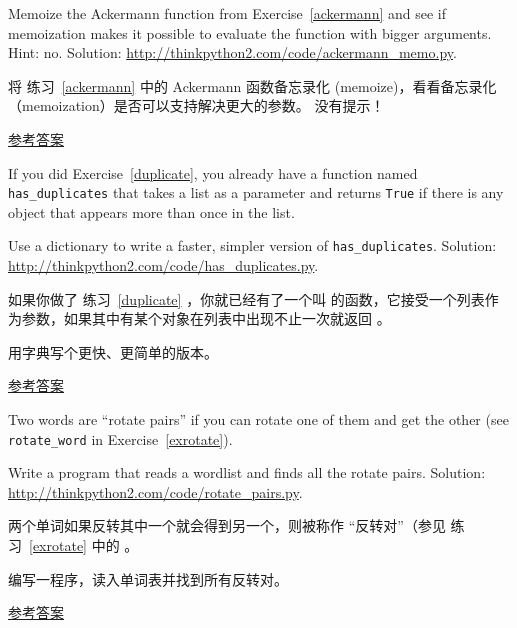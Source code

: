 \begin{exercise}
Memoize the Ackermann function from Exercise~\ref{ackermann} and see if
memoization makes it possible to evaluate the function with bigger
arguments.  Hint: no.
Solution: \url{http://thinkpython2.com/code/ackermann_memo.py}.

将 练习~\ref{ackermann} 中的 Ackermann 函数备忘录化 (memoize)，看看备忘录化（memoization）是否可以支持解决更大的参数。 没有提示！

\href{http://thinkpython2.com/code/ackermann_memo.py}{参考答案}
  

\end{exercise}

\begin{exercise}


If you did Exercise~\ref{duplicate}, you already have
a function named \verb"has_duplicates" that takes a list
as a parameter and returns {\tt True} if there is any object
that appears more than once in the list.

Use a dictionary to write a faster, simpler version of
\verb"has_duplicates".
Solution: \url{http://thinkpython2.com/code/has_duplicates.py}.

如果你做了 练习~\ref{duplicate} ，你就已经有了一个叫  的函数，它接受一个列表作为参数，如果其中有某个对象在列表中出现不止一次就返回 。

用字典写个更快、更简单的版本。

\href{http://thinkpython2.com/code/has_duplicates.py}{参考答案}


\end{exercise}


\begin{exercise}
\label{exrotatepairs}

  

Two words are ``rotate pairs'' if you can rotate one of them
and get the other (see \verb"rotate_word" in Exercise~\ref{exrotate}).

Write a program that reads a wordlist and finds all the rotate
pairs.  Solution: \url{http://thinkpython2.com/code/rotate_pairs.py}.

两个单词如果反转其中一个就会得到另一个，则被称作 ``反转对''（参见 练习~\ref{exrotate} 中的  。

编写一程序，读入单词表并找到所有反转对。

\href{http://thinkpython2.com/code/rotate_pairs.py}{参考答案}

\end{exercise}


